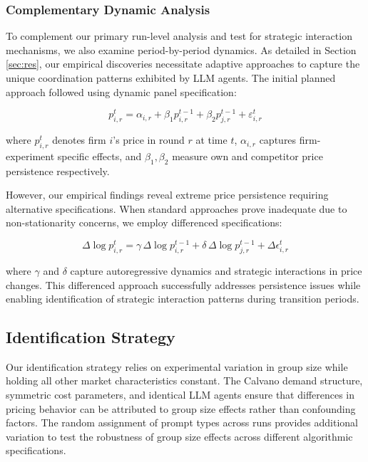 \subsubsection*{Complementary Dynamic Analysis}

To complement our primary run-level analysis and test for strategic interaction mechanisms, we also examine period-by-period dynamics. As detailed in Section \ref{sec:res}, our empirical discoveries necessitate adaptive approaches to capture the unique coordination patterns exhibited by LLM agents. The initial planned approach followed \textcite{fish_algorithmic_2025} using dynamic panel specification:

\begin{equation}\label{eq:dynamic_panel}
    p_{i,r}^t = \alpha_{i,r} + \beta_1 p_{i,r}^{t-1} + \beta_2 p_{j,r}^{t-1} + \varepsilon_{i,r}^t
\end{equation}

where $p_{i,r}^t$ denotes firm $i$'s price in round $r$ at time $t$, $\alpha_{i,r}$ captures firm-experiment specific effects, and $\beta_1, \beta_2$ measure own and competitor price persistence respectively.

However, our empirical findings reveal extreme price persistence requiring alternative specifications. When standard approaches prove inadequate due to non-stationarity concerns, we employ differenced specifications:

\begin{equation}\label{eq:differenced_fe}
    \Delta \log p_{i,r}^{t} = \gamma \, \Delta \log p_{i,r}^{t-1} + \delta \, \Delta \log p_{j,r}^{t-1} + \Delta \epsilon_{i,r}^t
\end{equation}

where $\gamma$ and $\delta$ capture autoregressive dynamics and strategic interactions in price changes. This differenced approach successfully addresses persistence issues while enabling identification of strategic interaction patterns during transition periods.

\subsection{Identification Strategy}

Our identification strategy relies on experimental variation in group size while holding all other market characteristics constant. The Calvano demand structure, symmetric cost parameters, and identical LLM agents ensure that differences in pricing behavior can be attributed to group size effects rather than confounding factors. The random assignment of prompt types across runs provides additional variation to test the robustness of group size effects across different algorithmic specifications.

